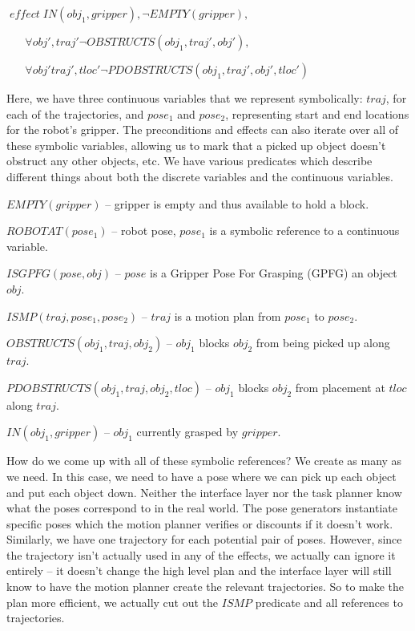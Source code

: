 \documentclass[12pt]{article}
\begin{document}
$\; effect \; IN(obj_1, gripper), \neg EMPTY(gripper), $

$\; \; \;\; \; \; \forall obj', traj' \neg OBSTRUCTS(obj_1, traj', obj'), $

$\; \; \; \; \; \;\forall obj' traj', tloc' \neg PDOBSTRUCTS(obj_1, traj', obj', tloc')$

\vspace{10}

Here, we have three continuous variables that we represent symbolically: $traj$, for each of the trajectories, and $pose_1$ and $pose_2$, representing start and end locations for the robot's gripper.
The preconditions and effects can also iterate over all of these symbolic variables, allowing us to mark that a picked up object doesn't obstruct any other objects, etc. 
We have various predicates which describe different things about both the discrete variables and the continuous variables.

\vspace{10}

$EMPTY(gripper)$ -- gripper is empty and thus available to hold a block.

$ROBOTAT(pose_1)$ -- robot pose,  $pose_1$ is a symbolic reference to a continuous variable.

$ISGPFG(pose, obj)$ -- $pose$ is a Gripper Pose For Grasping (GPFG) an object $obj$.

$ISMP(traj, pose_1, pose_2)$ -- $traj$ is a motion plan from $pose_1$ to $pose_2$.

$OBSTRUCTS(obj_1, traj, obj_2)$ -- $obj_1$ blocks $obj_2$ from being picked up along $traj$.

$PDOBSTRUCTS(obj_1, traj, obj_2, tloc)$ -- $obj_1$ blocks $obj_2$ from placement at $tloc$ along $traj$.

$IN(obj_1, gripper)$ -- $obj_1$ currently grasped by $gripper$.

\vspace{10}

How do we come up with all of these symbolic references?  
We create as many as we need.  
In this case, we need to have a pose where we can pick up each object and put each object down.  
Neither the interface layer nor the task planner know what the poses correspond to in the real world.
The pose generators instantiate specific poses which the motion planner verifies or discounts if it doesn't work.
Similarly, we have one trajectory for each potential pair of poses.  
However, since the trajectory isn't actually used in any of the effects, we actually can ignore it entirely -- it doesn't change the high level plan and the interface layer will still know to have the motion planner create the relevant trajectories. 
So to make the plan more efficient, we actually cut out the $ISMP$ predicate and all references to trajectories.
\end{document}
